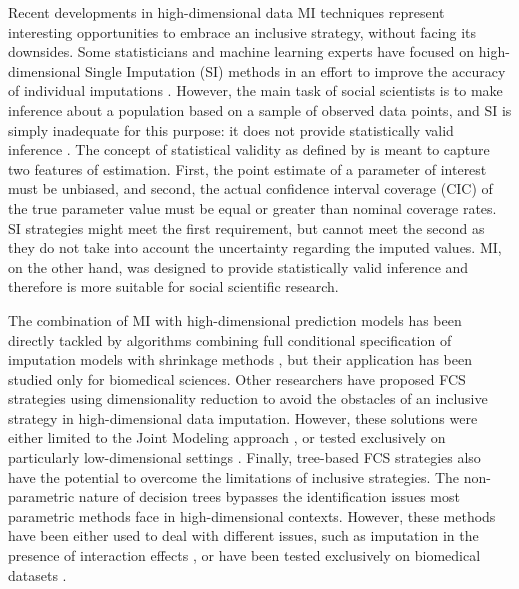 Recent developments in high-dimensional data MI techniques represent interesting opportunities to embrace an 
inclusive strategy, without facing its downsides.
Some statisticians and machine learning experts have focused on high-dimensional Single Imputation (SI) methods in 
an effort to improve the accuracy of individual imputations \citep[e.g.][]{kimEtAl:2005, stekhovenBuhlmann:2011, 
d'ambrosioEtAl:2012}. 
However, the main task of social scientists is to make inference about a population based on a sample of observed 
data points, and SI is simply inadequate for this purpose: it does not provide statistically valid 
inference \citep{rubin:1996}.
The concept of statistical validity as defined by \citep{rubin:1996} is meant to capture two features of 
estimation.
First, the point estimate of a parameter of interest must be unbiased, and second, the actual 
confidence interval coverage (CIC) of the true parameter value must be equal or greater than nominal 
coverage rates.
SI strategies might meet the first requirement, but cannot meet the second as they 
do not take into account the uncertainty regarding the imputed values.
MI, on the other hand, was designed to provide statistically valid inference and therefore is 
more suitable for social scientific research.

The combination of MI with high-dimensional prediction models has been directly tackled by algorithms combining 
full conditional specification of imputation models with shrinkage methods \citep{zhaoLong:2016, dengEtAl:2016},
but their application has been studied only for biomedical sciences.
Other researchers have proposed FCS strategies using dimensionality reduction to avoid the obstacles of an inclusive
strategy in high-dimensional data imputation.
However, these solutions were either limited to the Joint Modeling approach \citep{songBelin:2004}, 
or tested exclusively on particularly low-dimensional settings \citep{howardEtAl:2015}.
Finally, tree-based FCS strategies also have the potential to overcome the limitations of inclusive strategies.
The non-parametric nature of decision trees bypasses the identification issues most parametric methods face
in high-dimensional contexts.
However, these methods have been either used to deal with different issues, such as imputation in the presence
of interaction effects \citep{dooveEtAl:2014}, or have been tested exclusively on biomedical datasets 
\citep{shahEtAl:2014}.
%
